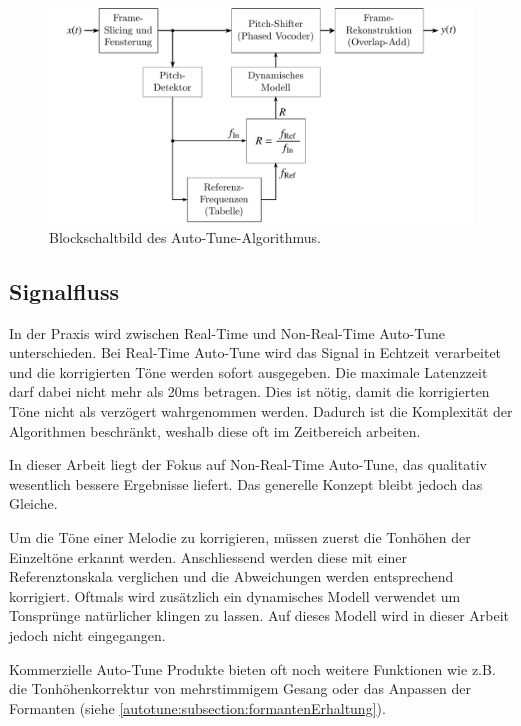 \begin{figure}
	\centering
	\includegraphics[width=\textwidth]{papers/autotune/images/Blockdiagram.pdf}
	\caption{Blockschaltbild des Auto-Tune-Algorithmus.}
    \label{autotune:fig:blockschaltbild}
\end{figure}


\subsection{Signalfluss}
\label{autotune:subsection:signalfluss}
In der Praxis wird zwischen Real-Time und Non-Real-Time Auto-Tune unterschieden.
Bei Real-Time Auto-Tune wird das Signal in Echtzeit verarbeitet und die korrigierten Töne werden sofort ausgegeben.
Die maximale Latenzzeit darf dabei nicht mehr als 20\;ms betragen.
Dies ist nötig, damit die korrigierten Töne nicht als verzögert wahrgenommen werden.
Dadurch ist die Komplexität der Algorithmen beschränkt, weshalb diese oft im Zeitbereich arbeiten.

In dieser Arbeit liegt der Fokus auf Non-Real-Time Auto-Tune, das qualitativ wesentlich bessere Ergebnisse liefert.
Das generelle Konzept bleibt jedoch das Gleiche.

Um die Töne einer Melodie zu korrigieren, müssen zuerst die Tonhöhen der Einzeltöne erkannt werden.
Anschliessend werden diese mit einer Referenztonskala verglichen und die Abweichungen werden entsprechend korrigiert.
Oftmals wird zusätzlich ein dynamisches Modell verwendet um Tonsprünge natürlicher klingen zu lassen.
Auf dieses Modell wird in dieser Arbeit jedoch nicht eingegangen.

Kommerzielle Auto-Tune Produkte bieten oft noch weitere Funktionen wie z.B. die Tonhöhenkorrektur von mehrstimmigem Gesang oder das Anpassen der Formanten (siehe \ref{autotune:subsection:formantenErhaltung}).
